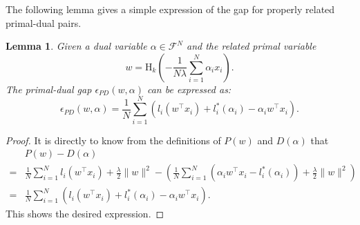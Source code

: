 \documentclass[11pt]{article}
\newtheorem{lemma}{Lemma}
\numberwithin{equation}{section}
\numberwithin{table}{section}
\numberwithin{figure}{section}
\begin{document}
The following lemma gives a simple expression of the gap for properly related primal-dual pairs.
\begin{lemma}\label{lemma:gap}
Given a dual variable $\alpha \in \mathcal{F}^N$ and the related primal variable
\[
w = \mathrm{H}_k\left(-\frac{1}{N\lambda} \sum_{i=1}^N \alpha_i x_i \right).
\]
The primal-dual gap $\epsilon_{PD}(w,\alpha)$ can be expressed as:
\[
\epsilon_{PD}(w,\alpha) = \frac{1}{N}\sum_{i=1}^N \left(l_i(w^\top x_i) + l_i^*(\alpha_i) - \alpha_i w^\top x_i\right).
\]
\end{lemma}
\begin{proof}
It is directly to know from the definitions of $P(w)$ and $D(\alpha)$ that
\[
\begin{aligned}
&P(w) - D(\alpha) \\
=& \frac{1}{N}\sum_{i=1}^N l_i(w^\top x_i) + \frac{\lambda}{2} \|w\|^2 - \left(\frac{1}{N}\sum_{i=1}^N\left(\alpha_iw^\top x_i - l^*_i(\alpha_i)\right) + \frac{\lambda}{2}\|w\|^2\right) \\
=& \frac{1}{N}\sum_{i=1}^N \left(l_i(w^\top x_i) + l_i^*(\alpha_i) - \alpha_i w^\top x_i\right).
\end{aligned}
\]
This shows the desired expression.
\end{proof}
\end{document}

